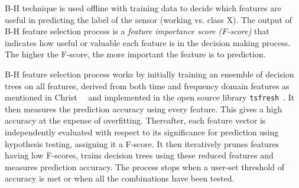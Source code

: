 B-H technique is used offline with training data to decide which features are useful in predicting the label of the sensor (\eg working vs. class X). The output of B-H feature selection process is a \textit{feature importance score (F-score)} that indicates how useful or valuable each feature is in the decision making process. The higher the F-score, the more important the feature is to prediction. 

B-H feature selection process works by initially training an ensemble of decision trees on all features, derived from both time and frequency domain features as mentioned in Christ~\etal~\cite{christ2018time} and implemented in the open source library \texttt{tsfresh}~\cite{tsfresh2018code}. It then measures the prediction accuracy using every feature. This gives a high accuracy at the expense of overfitting. Thereafter, each feature vector is independently evaluated with respect to its significance for prediction using hypothesis testing, assigning it a F-score. It then iteratively prunes features having low F-scores, trains decision trees using these reduced features and measures prediction accuracy. The process stops when a user-set threshold of accuracy is met or when all the combinations have been tested. 

